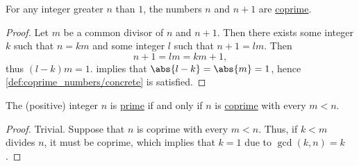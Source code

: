 \begin{proposition}\label{thm:n_plus_1_coprime}
  For any integer greater \( n \) than \( 1 \), the numbers \( n \) and \( n + 1 \) are \hyperref[def:coprime_elements]{coprime}.
\end{proposition}
\begin{proof}
  Let \( m \) be a common divisor of \( n \) and \( n + 1 \). Then there exists some integer \( k \) such that \( n = km \) and some integer \( l \) such that \( n + 1 = lm \). Then
  \begin{equation*}
    n + 1 = lm = km + 1,
  \end{equation*}
  thus \( (l - k)m = 1 \).  implies that \( \abs{l - k} = \abs{m} = 1 \), hence \cref{def:coprime_numbers/concrete} is satisfied.
\end{proof}

\begin{proposition}\label{thm:primality_via_coprimality}
  The (positive) integer \( n \) is \hyperref[def:prime_number]{prime} if and only if \( n \) is \hyperref[def:coprime_numbers]{coprime} with every \( m < n \).
\end{proposition}
\begin{proof}
  \SufficiencySubProof Trivial.
  \NecessitySubProof Suppose that \( n \) is coprime with every \( m < n \). Thus, if \( k < m \) divides \( n \), it must be coprime, which implies that \( k = 1 \) due to \( \gcd(k, n) = k \).
\end{proof}

